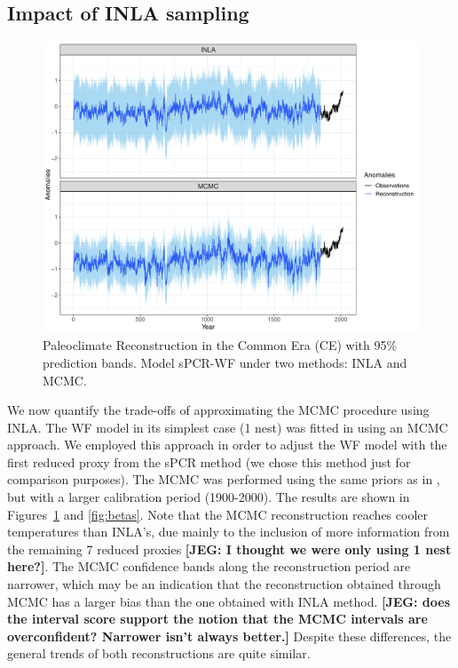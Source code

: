 \documentclass[12pt]{amsart}
\theoremstyle{plain}
\theoremstyle{definition}
\theoremstyle{remark}
\newcommand{\jeg}[1]{\color{ProcessBlue}\textbf{[JEG: #1]}\normalcolor}
\begin{document}
\subsection{Impact of INLA sampling}

\begin{figure}
  \centering
  \includegraphics[scale=0.5]{RecCE_MCMC}
  \caption{Paleoclimate Reconstruction in the Common Era (CE) with 95\%
    prediction bands. Model sPCR-WF under two methods: INLA and MCMC.}
  \label{fig:paleoCE4}
\end{figure}

We now quantify the trade-offs of approximating the MCMC procedure using INLA. The WF model in its simplest case (1 nest) was fitted in \cite{Barboza2014}
using an MCMC approach. We employed this approach in order to adjust the
WF model with the first reduced proxy from the sPCR method (we chose this method
just for comparison purposes). The MCMC was performed using the
same priors as in \cite{Barboza2014}, but with a larger calibration period
(1900-2000). The results are shown in Figures~\ref{fig:paleoCE4} and
\ref{fig:betas}. Note that the MCMC reconstruction reaches cooler temperatures than INLA's, due
mainly to the inclusion of more information from the remaining 7 reduced
proxies \jeg{I thought we were only using 1 nest here?}. The MCMC confidence bands along the reconstruction period are narrower,
which may be an indication that the  reconstruction obtained through MCMC has a larger
bias than the one obtained with INLA method. \jeg{does the interval score support the notion that the MCMC intervals are overconfident? Narrower isn't always better.} Despite these differences, the general trends of both reconstructions are quite similar. 
\end{document}
